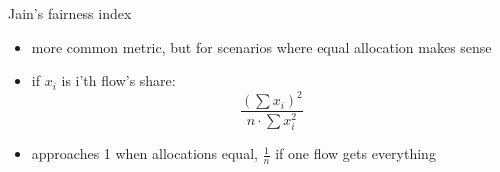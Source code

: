 \begin{frame}{Jain's fairness index}
    \begin{itemize}
    \item more common metric, but for scenarios where equal allocation makes sense
    \vspace{.5cm}
    \item if $x_i$ is i'th flow's share: \\
    \[\frac{\left(\sum x_i\right)^2}{n\cdot\sum x_i^2}\]
    \vspace{.5cm}
    \item approaches 1 when allocations equal, $\frac{1}{n}$ if one flow gets everything
    \end{itemize}
\end{frame}

